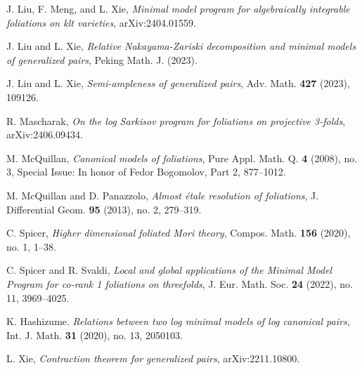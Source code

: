 \documentclass[preprint,12pt]{elsarticle}
\begin{document}
\begin{thebibliography}{00}
 J. Liu, F. Meng, and L. Xie, \textit{Minimal model program for algebraically integrable foliations on klt varieties}, arXiv:2404.01559.

 J. Liu and L. Xie, \textit{Relative Nakayama-Zariski decomposition and minimal models of generalized pairs}, Peking Math. J. (2023).

 J. Liu and L. Xie, \textit{Semi-ampleness of generalized pairs}, Adv. Math. \textbf{427} (2023), 109126.

 R. Mascharak, \textit{On the log Sarkisov program for foliations on projective 3-folds}, arXiv:2406.09434.

 M. McQuillan, \textit{Canonical models of foliations}, Pure Appl. Math. Q. \textbf{4} (2008), no. 3, Special Issue: In honor of Fedor Bogomolov, Part 2, 877--1012.

 M. McQuillan and D. Panazzolo, \textit{Almost \'etale resolution of foliations}, J. Differential Geom. \textbf{95} (2013), no. 2, 279--319.


 C. Spicer, \textit{Higher dimensional foliated Mori theory}, Compos. Math. \textbf{156} (2020), no. 1, 1--38.

 C. Spicer and R. Svaldi, \textit{Local and global applications of the Minimal Model Program for co-rank 1 foliations on threefolds}, J. Eur. Math. Soc. \textbf{24} (2022), no. 11, 3969--4025.

 K. Hashizume. \textit{Relations between two log minimal models of log canonical pairs}, Int. J. Math. \textbf{31} (2020), no. 13, 2050103. 

 L. Xie, \textit{Contraction theorem for generalized pairs}, arXiv:2211.10800.

\end{thebibliography}
\end{document}
